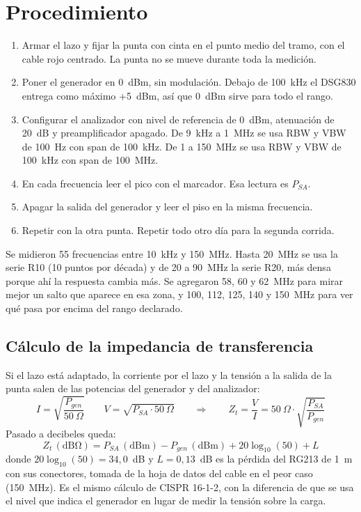 \documentclass[11pt,a4paper]{article}
\begin{document}
\section{Procedimiento}

\begin{enumerate}
  \item Armar el lazo y fijar la punta con cinta en el punto medio del tramo, con el cable rojo centrado. La punta no se mueve durante toda la medición.
  \item Poner el generador en 0~dBm, sin modulación. Debajo de 100~kHz el DSG830 entrega como máximo +5~dBm, así que 0~dBm sirve para todo el rango.
  \item Configurar el analizador con nivel de referencia de 0~dBm, atenuación de 20~dB y preamplificador apagado. De 9~kHz a 1~MHz se usa RBW y VBW de 100~Hz con span de 100~kHz. De 1 a 150~MHz se usa RBW y VBW de 100~kHz con span de 100~MHz.
  \item En cada frecuencia leer el pico con el marcador. Esa lectura es $P_{SA}$.
  \item Apagar la salida del generador y leer el piso en la misma frecuencia.
  \item Repetir con la otra punta. Repetir todo otro día para la segunda corrida.
\end{enumerate}

Se midieron 55 frecuencias entre 10~kHz y 150~MHz. Hasta 20~MHz se usa la serie R10 (10 puntos por década) y de 20 a 90~MHz la serie R20, más densa porque ahí la respuesta cambia más. Se agregaron 58, 60 y 62~MHz para mirar mejor un salto que aparece en esa zona, y 100, 112, 125, 140 y 150~MHz para ver qué pasa por encima del rango declarado.

\subsection{Cálculo de la impedancia de transferencia}

Si el lazo está adaptado, la corriente por el lazo y la tensión a la salida de la punta salen de las potencias del generador y del analizador:
\begin{equation}
  I = \sqrt{\frac{P_{gen}}{50~\Omega}} \qquad V = \sqrt{P_{SA} \cdot 50~\Omega}
  \qquad \Rightarrow \qquad Z_t = \frac{V}{I} = 50~\Omega \cdot \sqrt{\frac{P_{SA}}{P_{gen}}}
\end{equation}
Pasado a decibeles queda:
\begin{equation}
  Z_t\,(\mathrm{dB\Omega}) = P_{SA}\,(\mathrm{dBm}) - P_{gen}\,(\mathrm{dBm}) + 20\log_{10}(50) + L
\end{equation}
donde $20\log_{10}(50) = 34{,}0$~dB y $L = 0{,}13$~dB es la pérdida del RG213 de 1~m con sus conectores, tomada de la hoja de datos del cable en el peor caso (150~MHz). Es el mismo cálculo de CISPR 16-1-2, con la diferencia de que se usa el nivel que indica el generador en lugar de medir la tensión sobre la carga.
\end{document}

